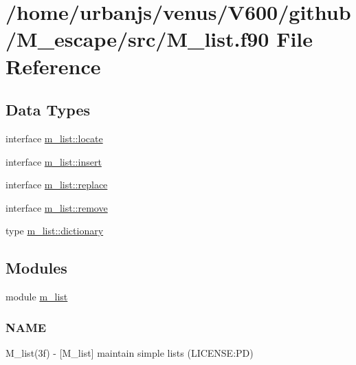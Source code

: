 \hypertarget{M__list_8f90}{}\section{/home/urbanjs/venus/\+V600/github/\+M\+\_\+escape/src/\+M\+\_\+list.f90 File Reference}
\label{M__list_8f90}
\subsection*{Data Types}
\begin{DoxyCompactItemize}
\item 
interface \mbox{\hyperlink{interfacem__list_1_1locate}{m\+\_\+list\+::locate}}
\item 
interface \mbox{\hyperlink{interfacem__list_1_1insert}{m\+\_\+list\+::insert}}
\item 
interface \mbox{\hyperlink{interfacem__list_1_1replace}{m\+\_\+list\+::replace}}
\item 
interface \mbox{\hyperlink{interfacem__list_1_1remove}{m\+\_\+list\+::remove}}
\item 
type \mbox{\hyperlink{structm__list_1_1dictionary}{m\+\_\+list\+::dictionary}}
\end{DoxyCompactItemize}
\subsection*{Modules}
\begin{DoxyCompactItemize}
\item 
module \mbox{\hyperlink{namespacem__list}{m\+\_\+list}}
\begin{DoxyCompactList}\small\item\em \subsubsection*{N\+A\+ME}

M\+\_\+list(3f) -\/ \mbox{[}M\+\_\+list\mbox{]} maintain simple lists (L\+I\+C\+E\+N\+SE\+:PD) \end{DoxyCompactList}\end{DoxyCompactItemize}
